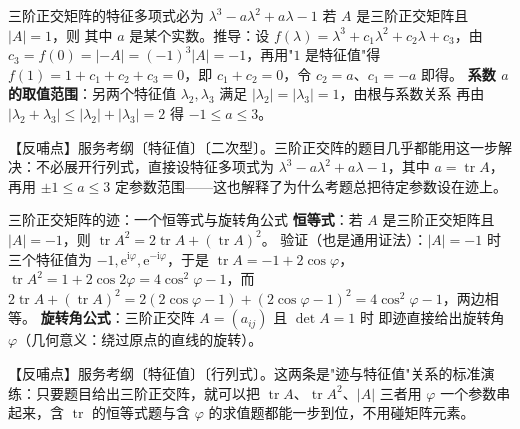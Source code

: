 \begin{fdeep}{三阶正交矩阵的特征多项式必为 $\lambda^{3}-a\lambda^{2}+a\lambda-1$}
若 $A$ 是三阶正交矩阵且 $|A|=1$，则
其中 $a$ 是某个实数。推导：设 $f(\lambda)=\lambda^{3}+c_{1}\lambda^{2}+c_{2}\lambda+c_{3}$，由 $c_{3}=f(0)=|{-}A|=(-1)^{3}|A|=-1$，再用"$1$ 是特征值"得 $f(1)=1+c_{1}+c_{2}+c_{3}=0$，即 $c_{1}+c_{2}=0$，令 $c_{2}=a$、$c_{1}=-a$ 即得。
\textbf{系数 $a$ 的取值范围}：另两个特征值 $\lambda_{2},\lambda_{3}$ 满足 $|\lambda_{2}|=|\lambda_{3}|=1$，由根与系数关系
再由 $|\lambda_{2}+\lambda_{3}|\le|\lambda_{2}|+|\lambda_{3}|=2$ 得 $-1\le a\le3$。

【反哺点】服务考纲〔特征值〕〔二次型〕。三阶正交阵的题目几乎都能用这一步解决：不必展开行列式，直接设特征多项式为 $\lambda^{3}-a\lambda^{2}+a\lambda-1$，其中 $a=\operatorname{tr}A$，再用 $\pm1\le a\le3$ 定参数范围——这也解释了为什么考题总把待定参数设在迹上。
\end{fdeep}


\begin{fdeep}{三阶正交矩阵的迹：一个恒等式与旋转角公式}
\textbf{恒等式}：若 $A$ 是三阶正交矩阵且 $|A|=-1$，则 $\operatorname{tr}A^{2}=2\operatorname{tr}A+(\operatorname{tr}A)^{2}$。
验证（也是通用证法）：$|A|=-1$ 时三个特征值为 $-1,\mathrm e^{\mathrm i\varphi},\mathrm e^{-\mathrm i\varphi}$，于是 $\operatorname{tr}A=-1+2\cos\varphi$，$\operatorname{tr}A^{2}=1+2\cos2\varphi=4\cos^{2}\varphi-1$，而 $2\operatorname{tr}A+(\operatorname{tr}A)^{2}=2(2\cos\varphi-1)+(2\cos\varphi-1)^{2}=4\cos^{2}\varphi-1$，两边相等。
\textbf{旋转角公式}：三阶正交阵 $A=(a_{ij})$ 且 $\det A=1$ 时
即迹直接给出旋转角 $\varphi$（几何意义：绕过原点的直线的旋转）。

【反哺点】服务考纲〔特征值〕〔行列式〕。这两条是"迹与特征值"关系的标准演练：只要题目给出三阶正交阵，就可以把 $\operatorname{tr}A$、$\operatorname{tr}A^{2}$、$|A|$ 三者用 $\varphi$ 一个参数串起来，含 $\operatorname{tr}$ 的恒等式题与含 $\varphi$ 的求值题都能一步到位，不用碰矩阵元素。
\end{fdeep}


